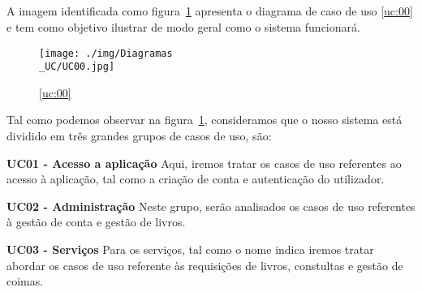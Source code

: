 \subsection{}
A imagem identificada como figura~\ref{fig:chap210} apresenta o diagrama de caso de uso \ref{uc:00} e tem como objetivo ilustrar de modo geral como o sistema funcionará.

\vspace*{5mm}

\begin{figure}[H]
	\centering
	\texttt{[image: ./img/Diagramas\\\_UC/UC00.jpg]}  %
	\caption{\ref{uc:00}}
	\label{fig:chap210}
\end{figure}

\par Tal como podemos observar na figura~\ref{fig:chap210}, consideramos que o nosso sistema está dividido em três grandes grupos de casos de uso, são:

\textbf{UC01 - Acesso a aplicação}  Aqui, iremos tratar os casos de uso referentes ao acesso à aplicação, tal como a criação de conta e autenticação do utilizador.

\textbf{UC02 - Administração}  Neste grupo, serão analisados os casos de uso referentes à gestão de conta e gestão de livros.

\textbf{UC03 - Serviços}  Para os serviços, tal como o nome indica iremos tratar abordar os casos de uso referente às requisições de livros, constultas e gestão de coimas.